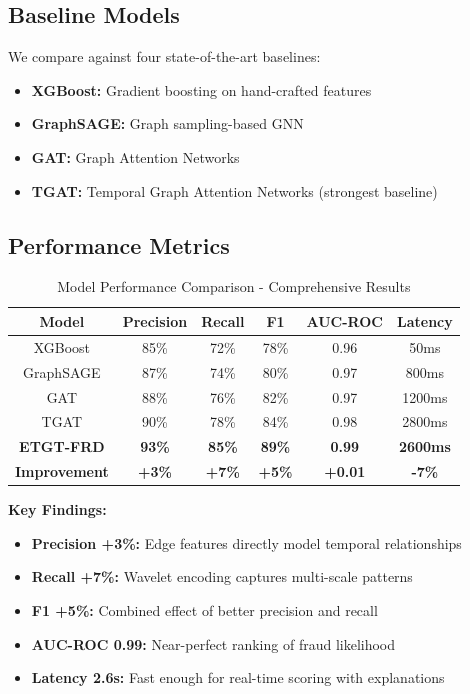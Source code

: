 \documentclass[10pt,conference,compsociety]{IEEEtran}
\begin{document}
\subsection{Baseline Models}

We compare against four state-of-the-art baselines:

\begin{itemize}
    \item \textbf{XGBoost:} Gradient boosting on hand-crafted features
    \item \textbf{GraphSAGE:} Graph sampling-based GNN
    \item \textbf{GAT:} Graph Attention Networks
    \item \textbf{TGAT:} Temporal Graph Attention Networks (strongest baseline)
\end{itemize}

\subsection{Performance Metrics}

\begin{table}[!h]
\centering
\caption{Model Performance Comparison - Comprehensive Results}
\begin{tabular}{|c|ccccc|}
\hline
\textbf{Model} & \textbf{Precision} & \textbf{Recall} & \textbf{F1} & \textbf{AUC-ROC} & \textbf{Latency} \\
\hline
XGBoost & 85\% & 72\% & 78\% & 0.96 & 50ms \\
GraphSAGE & 87\% & 74\% & 80\% & 0.97 & 800ms \\
GAT & 88\% & 76\% & 82\% & 0.97 & 1200ms \\
TGAT & 90\% & 78\% & 84\% & 0.98 & 2800ms \\
\textbf{ETGT-FRD} & \textbf{93\%} & \textbf{85\%} & \textbf{89\%} & \textbf{0.99} & \textbf{2600ms} \\
\hline
\textbf{Improvement} & \textbf{+3\%} & \textbf{+7\%} & \textbf{+5\%} & \textbf{+0.01} & \textbf{-7\%} \\
\hline
\end{tabular}
\end{table}

\textbf{Key Findings:}
\begin{itemize}
    \item \textbf{Precision +3\%:} Edge features directly model temporal relationships
    \item \textbf{Recall +7\%:} Wavelet encoding captures multi-scale patterns
    \item \textbf{F1 +5\%:} Combined effect of better precision and recall
    \item \textbf{AUC-ROC 0.99:} Near-perfect ranking of fraud likelihood
    \item \textbf{Latency 2.6s:} Fast enough for real-time scoring with explanations
\end{itemize}
\end{document}
